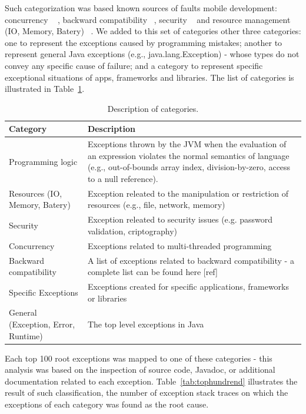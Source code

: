 \documentclass[conference]{IEEEtran}
\begin{document}
Such categorization was based known sources of faults mobile development: concurrency ~\cite{ama2012}
, backward compatibility  ~\cite{McDon13}, security   ~\cite{enck2011study} and resource management (IO, Memory, Batery) ~\cite{Zhang12}.
We added to this set of categories other three categories: one to represent the exceptions caused by programming mistakes;
  another to represent general Java exceptions (e.g., java.lang.Exception) - whose types do not convey any specific cause of failure; and a category to
represent specific  exceptional situations of apps, frameworks and libraries.
The list of categories is illustrated in Table~\ref{tab:categories}. 

\begin{table}
  \centering
  \begin{tabular}{|p{2cm}| p{5cm}|}
    \hline
    \bfseries{Category} & \bfseries{Description} \\
    \hline
      Programming logic &  Exceptions thrown by the JVM when the 
evaluation of an expression violates the normal semantics of language (e.g., 
out-of-bounds array index, division-by-zero, access to a null reference). \\ \hline
      Resources (IO, Memory, Batery)  & Exception releated to the manipulation or restriction of resources (e.g., file, network, memory) \\ \hline
      Security                               & Exception releated to security issues (e.g. password validation, criptography) \\ \hline
      Concurrency                            & Exceptions related to multi-threaded programming \\ \hline
      Backward compatibility                 &  A list of exceptions related to backward compatibility - a complete list can be found here [ref]  \\ \hline
      Specific Exceptions              & Exceptions created for specific applications, frameworks or libraries \\ \hline
      General (Exception, Error, Runtime)    & The top level exceptions in Java    \\ \hline
    \hline
  \end{tabular}
  \caption{Description of categories.}
  \label{tab:categories}
\end{table}

Each top 100 root exceptions was mapped to one of these categories - 
this analysis was based on the inspection of source code, Javadoc, or additional 
documentation related to each exception.  Table~\ref{tab:tophundrend} 
illustrates the result of such classification, the number of exception stack traces
on which the exceptions of each category was found as the root cause.
\end{document}
